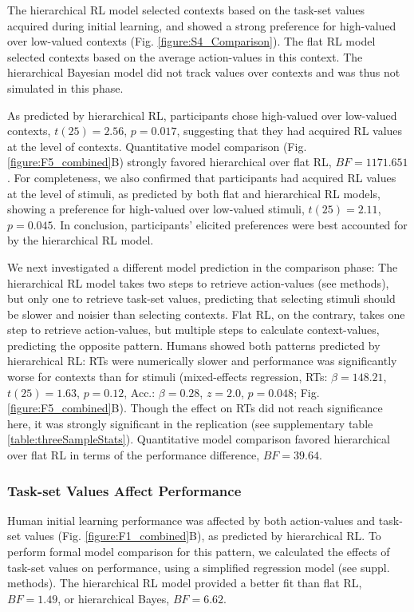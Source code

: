 \documentclass[10pt,letterpaper]{article}  %
\begin{document}
The hierarchical RL model selected contexts based on the task-set values acquired during initial learning, and showed a strong preference for high-valued over low-valued contexts (Fig. \ref{figure:S4_Comparison}).
The flat RL model selected contexts based on the average action-values in this context.
The hierarchical Bayesian model did not track values over contexts and was thus not simulated in this phase.

As predicted by hierarchical RL, participants chose high-valued over low-valued contexts, $t(25)=2.56$, $p=0.017$, suggesting that they had acquired RL values at the level of contexts.
Quantitative model comparison (Fig. \ref{figure:F5_combined}B) strongly favored hierarchical over flat RL, $BF=1171.651$. For completeness, we also confirmed that participants had acquired RL values at the level of stimuli, as predicted by both flat and hierarchical RL models, showing a preference for high-valued over low-valued stimuli, $t(25)=2.11$, $p=0.045$. In conclusion, participants' elicited preferences were best accounted for by the hierarchical RL model.

We next investigated a different model prediction in the comparison phase: The hierarchical RL model takes two steps to retrieve action-values (see methods), but only one to retrieve task-set values, predicting that selecting stimuli should be slower and noisier than selecting contexts.
Flat RL, on the contrary, takes one step to retrieve action-values, but multiple steps to calculate context-values, predicting the opposite pattern.
Humans showed both patterns predicted by hierarchical RL: RTs were numerically slower and performance was significantly worse for contexts than for stimuli (mixed-effects regression, RTs: $\beta=148.21$, $t(25)=1.63$, $p=0.12$, Acc.: $\beta=0.28$, $z=2.0$, $p=0.048$; Fig. \ref{figure:F5_combined}B). Though the effect on RTs did not reach significance here, it was strongly significant in the replication (see supplementary table \ref{table:threeSampleStats}).
Quantitative model comparison favored hierarchical over flat RL in terms of the performance difference, $BF=39.64$.

\subsubsection*{Task-set Values Affect Performance}

Human initial learning performance was affected by both action-values and task-set values (Fig. \ref{figure:F1_combined}B), as predicted by hierarchical RL.
To perform formal model comparison for this pattern, we calculated the effects of task-set values on performance, using a simplified regression model (see suppl. methods). The hierarchical RL model provided a better fit than flat RL, $BF=1.49$, or hierarchical Bayes, $BF=6.62$.
\end{document}
